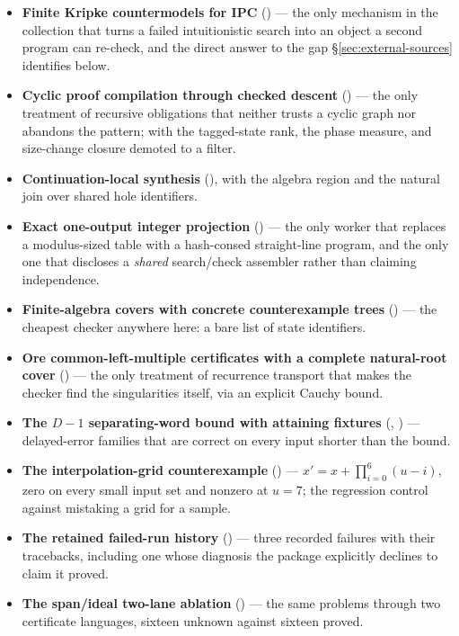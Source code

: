 \begin{itemize}[leftmargin=1.4em]
\item \textbf{Finite Kripke countermodels for \textsf{IPC}} () --- the
  only mechanism in the collection that turns a failed intuitionistic search
  into an object a second program can re-check, and the direct answer to the
  gap \S\ref{sec:external-sources} identifies below.
\item \textbf{Cyclic proof compilation through checked descent} () ---
  the only treatment of recursive obligations that neither trusts a cyclic graph
  nor abandons the pattern; with the tagged-state rank, the phase measure, and
  size-change closure demoted to a filter.
\item \textbf{Continuation-local synthesis} (), with the algebra
  region and the natural join over shared hole identifiers.
\item \textbf{Exact one-output integer projection} () --- the only
  worker that replaces a modulus-sized table with a hash-consed straight-line
  program, and the only one that discloses a \emph{shared} search/check
  assembler rather than claiming independence.
\item \textbf{Finite-algebra covers with concrete counterexample trees}
  () --- the cheapest checker anywhere here: a bare list of state
  identifiers.
\item \textbf{Ore common-left-multiple certificates with a complete natural-root
  cover} () --- the only treatment of recurrence transport that makes
  the checker find the singularities itself, via an explicit Cauchy bound.
\item \textbf{The $D-1$ separating-word bound with attaining fixtures}
  (, ) --- delayed-error families that are correct on every
  input shorter than the bound.
\item \textbf{The interpolation-grid counterexample} () ---
  $x'=x+\prod_{i=0}^{6}(u-i)$, zero on every small input set and nonzero at
  $u=7$; the regression control against mistaking a grid for a sample.
\item \textbf{The retained failed-run history} () --- three recorded
  failures with their tracebacks, including one whose diagnosis the package
  explicitly declines to claim it proved.
\item \textbf{The span/ideal two-lane ablation} () --- the same
  problems through two certificate languages, sixteen unknown against sixteen
  proved.
\end{itemize}

